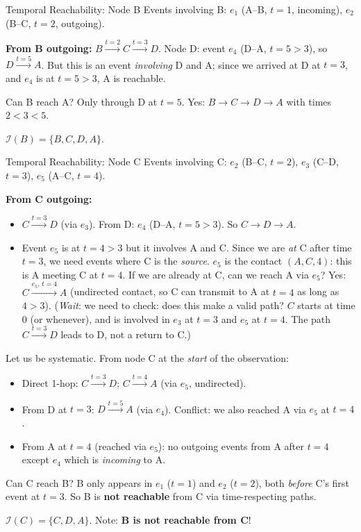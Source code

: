 \begin{examplebox}{Temporal Reachability: Node B}
Events involving B: $e_1$ (A--B, $t=1$, incoming), $e_2$ (B--C, $t=2$, outgoing).

\textbf{From B outgoing:}
$B \xrightarrow{t=2} C \xrightarrow{t=3} D$. Node D: event $e_4$ (D--A, $t=5>3$), so
$D \xrightarrow{t=5} A$. But this is an event \textit{involving} D and A; since we arrived at
D at $t=3$, and $e_4$ is at $t=5>3$, A is reachable.

Can B reach A? Only through D at $t=5$. Yes: $B \to C \to D \to A$ with times $2<3<5$.

$\mathcal{I}(B) = \{B, C, D, A\}$.
\end{examplebox}

\begin{examplebox}{Temporal Reachability: Node C}
Events involving C: $e_2$ (B--C, $t=2$), $e_3$ (C--D, $t=3$), $e_5$ (A--C, $t=4$).

\textbf{From C outgoing:}
\begin{itemize}[noitemsep]
  \item $C \xrightarrow{t=3} D$ (via $e_3$). From D: $e_4$ (D--A, $t=5>3$). So $C \to D \to A$.
  \item Event $e_5$ is at $t=4>3$ but it involves A and C. Since we are \textit{at} C after
        time $t=3$, we need events where C is the \textit{source}. $e_5$ is the contact $(A,C,4)$:
        this is A meeting C at $t=4$. If we are already at C, can we reach A via $e_5$? Yes: $C
        \xrightarrow{e_5,\,t=4} A$ (undirected contact, so C can transmit to A at $t=4$ as long
        as $4 > 3$). (\textit{Wait}: we need to check: does this make a valid path? $C$ starts at
        time $0$ (or whenever), and is involved in $e_3$ at $t=3$ and $e_5$ at $t=4$. The path
        $C \xrightarrow{t=3} D$ leads to D, not a return to C.)
\end{itemize}

Let us be systematic. From node C at the \textit{start} of the observation:
\begin{itemize}[noitemsep]
  \item Direct 1-hop: $C \xrightarrow{t=3} D$; $C \xrightarrow{t=4} A$ (via $e_5$, undirected).
  \item From D at $t=3$: $D \xrightarrow{t=5} A$ (via $e_4$). Conflict: we also reached A via $e_5$ at $t=4$.
  \item From A at $t=4$ (reached via $e_5$): no outgoing events from A after $t=4$ except $e_4$ which is \textit{incoming} to A.
\end{itemize}

Can C reach B? B only appears in $e_1$ ($t=1$) and $e_2$ ($t=2$), both \textit{before} C's
first event at $t=3$. So B is \textbf{not reachable} from C via time-respecting paths.

$\mathcal{I}(C) = \{C, D, A\}$. Note: \textbf{B is not reachable from C}!
\end{examplebox}

